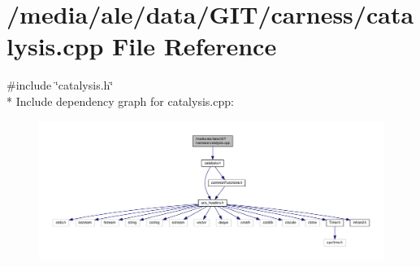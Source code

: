 \hypertarget{a00067}{\section{/media/ale/data/\-G\-I\-T/carness/catalysis.cpp File Reference}
\label{a00067}
}
{\ttfamily \#include \char`\"{}catalysis.\-h\char`\"{}}\\*
Include dependency graph for catalysis.\-cpp\-:\nopagebreak
\begin{figure}[H]
\begin{center}
\leavevmode
\includegraphics[width=350pt]{a00133}
\end{center}
\end{figure}

